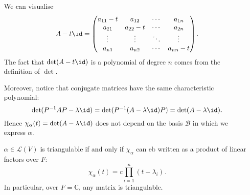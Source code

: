 \documentclass[12pt]{article}
\begin{document}
\begin{remark}
	We can visualise
	\[
	A - t \id =
	\begin{pmatrix}
		a_{11} - t & a_{12} & \cdots & a_{1n} \\
		a_{21} & a_{22} - t & \cdots & a_{2n} \\
		\vdots & \vdots & \ddots & \vdots \\
		a_{n1} & a_{n2} & \cdots & a_{nn} - t
	\end{pmatrix}
	.\]
	The fact that $\det(A - t \id)$ is a polynomial of degree $n$ comes from the definition of $\det$.

	Moreover, notice that conjugate matrices have the same characteristic polynomial:
	\[
		\det(P^{-1}AP - \lambda \id) = \det(P^{-1}(A - \lambda \id)P) = \det(A - \lambda \id)
	.\]
	Hence $\chi_\alpha(t) = \det(A - \lambda \id)$ does not depend on the basis $\mathcal{B}$ in which we express $\alpha$.
\end{remark}

\begin{theorem} 
	$\alpha \in \mathcal{L}(V)$ is triangulable if and only if $\chi_\alpha$ can eb written as a product of linear factors over $F$:
	\[
		\chi_\alpha(t) = c \prod_{i = 1}^{n} (t - \lambda_i)
	.\]
	In particular, over $F = \mathbb{C}$, any matrix is triangulable.
\end{theorem}
\end{document}
